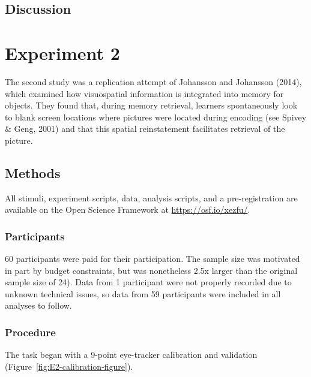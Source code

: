 \documentclass[
  man,floatsintext]{apa6}
\begin{document}
\hypertarget{discussion}{%
\subsection{Discussion}\label{discussion}}

\hypertarget{experiment-2}{%
\section{Experiment 2}\label{experiment-2}}

The second study was a replication attempt of Johansson and Johansson (2014),
which examined how visuospatial information is integrated into memory
for objects. They found that, during memory retrieval, learners
spontaneously look to blank screen locations where pictures were located
during encoding (see Spivey \& Geng, 2001) and that
this spatial reinstatement facilitates retrieval of the picture.

\hypertarget{methods-1}{%
\subsection{Methods}\label{methods-1}}

All stimuli, experiment scripts, data, analysis scripts, and a
pre-registration are available on the Open Science Framework at
\url{https://osf.io/xezfu/}.

\hypertarget{participants-2}{%
\subsubsection{Participants}\label{participants-2}}

60 participants were paid for their participation.
The sample size was motivated in part by budget constraints, but was
nonetheless 2.5x larger than the original sample size of 24).
Data from 1 participant were not properly
recorded due to unknown technical issues, so data from 59 participants
were included in all analyses to follow.

\hypertarget{procedure-1}{%
\subsubsection{Procedure}\label{procedure-1}}

The task began with a 9-point eye-tracker calibration
and validation (Figure~\ref{fig:E2-calibration-figure}).
\end{document}
